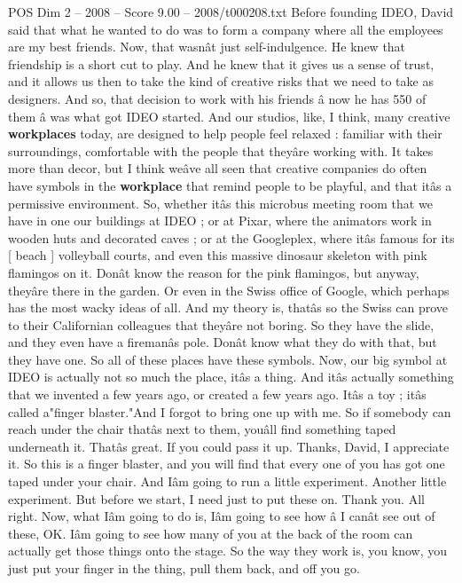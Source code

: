 \begin{textsample}{POS Dim 2 – 2008 – Score 9.00 – 2008/t000208.txt}
Before founding IDEO, David said that what he wanted to do was to form a company where all the employees are my best friends.
Now, that wasnât just self-indulgence.
He knew that friendship is a short cut to play.
And he knew that it gives us a sense of trust, and it allows us then to take the kind of creative risks that we need to take as designers.
And so, that decision to work with his friends â now he has 550 of them â was what got IDEO started.
And our studios, like, I think, many creative \textbf{workplaces} today, are designed to help people feel relaxed : familiar with their surroundings, comfortable with the people that theyâre working with.
It takes more than decor, but I think weâve all seen that creative companies do often have symbols in the \textbf{workplace} that remind people to be playful, and that itâs a permissive environment.
So, whether itâs this microbus meeting room that we have in one our buildings at IDEO ; or at Pixar, where the animators work in wooden huts and decorated caves ; or at the Googleplex, where itâs famous for its [ beach ] volleyball courts, and even this massive dinosaur skeleton with pink flamingos on it.
Donât know the reason for the pink flamingos, but anyway, theyâre there in the garden.
Or even in the Swiss office of Google, which perhaps has the most wacky ideas of all.
And my theory is, thatâs so the Swiss can prove to their Californian colleagues that theyâre not boring.
So they have the slide, and they even have a firemanâs pole.
Donât know what they do with that, but they have one.
So all of these places have these symbols.
Now, our big symbol at IDEO is actually not so much the place, itâs a thing.
And itâs actually something that we invented a few years ago, or created a few years ago.
Itâs a toy ; itâs called a"finger blaster."And I forgot to bring one up with me.
So if somebody can reach under the chair thatâs next to them, youâll find something taped underneath it.
Thatâs great.
If you could pass it up.
Thanks, David, I appreciate it.
So this is a finger blaster, and you will find that every one of you has got one taped under your chair.
And Iâm going to run a little experiment.
Another little experiment.
But before we start, I need just to put these on.
Thank you.
All right.
Now, what Iâm going to do is, Iâm going to see how â I canât see out of these, OK.
Iâm going to see how many of you at the back of the room can actually get those things onto the stage.
So the way they work is, you know, you just put your finger in the thing, pull them back, and off you go.

\end{textsample}
